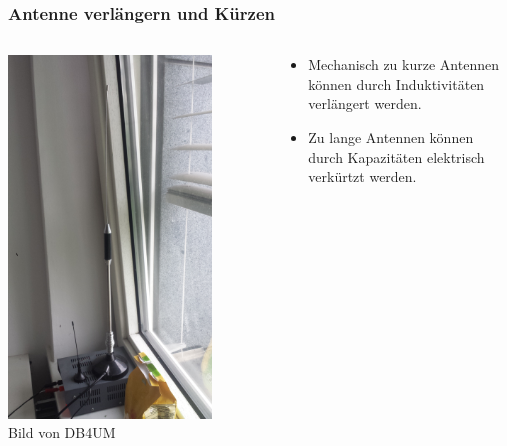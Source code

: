 \begin{frame}
    \frametitle{Antenne verlängern und Kürzen}
    \begin{columns}[c]
        \column[c]{5cm}
        \begin{center}
        \includegraphics[width=0.8\textwidth]{a09/Verkurzte_10m_Antenne.jpg}\\
        \tiny Bild von DB4UM
    \end{center}
    \column{5cm} \large
        \begin{center}
        \begin{itemize}
		\item Mechanisch zu kurze Antennen können durch Induktivitäten verlängert werden.
        \item Zu lange Antennen können durch Kapazitäten elektrisch verkürtzt werden.
    	\end{itemize}
    \end{center}
    \end{columns}
\end{frame}

